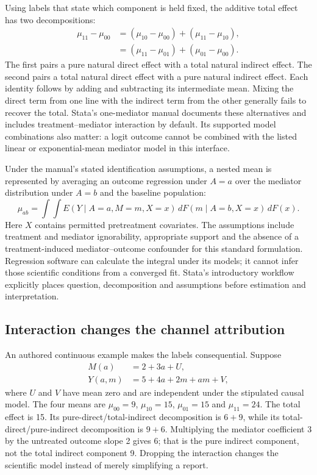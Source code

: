 Using labels that state which component is held fixed, the additive total effect has two decompositions:
\begin{align}
 \mu_{11}-\mu_{00}
  &=(\mu_{10}-\mu_{00})+(\mu_{11}-\mu_{10}),\nonumber\\
  &=(\mu_{11}-\mu_{01})+(\mu_{01}-\mu_{00}).
 \label{exec20:med-decompositions}
\end{align}
The first pairs a pure natural direct effect with a total natural indirect effect. The second pairs a total natural direct effect with a pure natural indirect effect. Each identity follows by adding and subtracting its intermediate mean. Mixing the direct term from one line with the indirect term from the other generally fails to recover the total. Stata's one-mediator manual documents these alternatives and includes treatment--mediator interaction by default. Its supported model combinations also matter: a logit outcome cannot be combined with the listed linear or exponential-mean mediator model in this interface.~\citep{exec20_med_stata_one}

Under the manual's stated identification assumptions, a nested mean is represented by averaging an outcome regression under $A=a$ over the mediator distribution under $A=b$ and the baseline population:
\begin{equation}
 \mu_{ab}=\int\!\!\int
 E(Y\mid A=a,M=m,X=x)\,dF(m\mid A=b,X=x)\,dF(x).
 \label{exec20:med-integral}
\end{equation}
Here $X$ contains permitted pretreatment covariates. The assumptions include treatment and mediator ignorability, appropriate support and the absence of a treatment-induced mediator--outcome confounder for this standard formulation. Regression software can calculate the integral under its models; it cannot infer those scientific conditions from a converged fit. Stata's introductory workflow explicitly places question, decomposition and assumptions before estimation and interpretation.~\citep{exec20_med_stata_one,exec20_med_stata_intro}

\subsection{Interaction changes the channel attribution}
\label{exec20:med-interaction}
An authored continuous example makes the labels consequential. Suppose
\begin{align}
 M(a)&=2+3a+U,\nonumber\\
 Y(a,m)&=5+4a+2m+am+V,
 \label{exec20:med-law}
\end{align}
where $U$ and $V$ have mean zero and are independent under the stipulated causal model. The four means are $\mu_{00}=9$, $\mu_{10}=15$, $\mu_{01}=15$ and $\mu_{11}=24$. The total effect is 15. Its pure-direct/total-indirect decomposition is $6+9$, while its total-direct/pure-indirect decomposition is $9+6$. Multiplying the mediator coefficient 3 by the untreated outcome slope 2 gives 6; that is the pure indirect component, not the total indirect component 9. Dropping the interaction changes the scientific model instead of merely simplifying a report.~\citep{exec20_med_reference}

